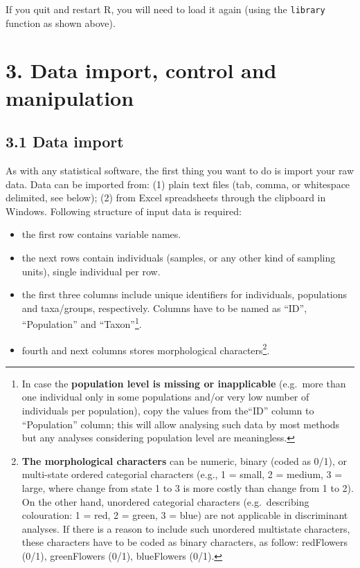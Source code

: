 \documentclass[
]{article}
\providecommand{\tightlist}{%
  \setlength{\itemsep}{0pt}\setlength{\parskip}{0pt}}
\begin{document}
If you quit and restart R, you will need to load it again (using the
\texttt{library} function as shown above).

\hypertarget{data-import-control-and-manipulation}{%
\section{3. Data import, control and
manipulation}\label{data-import-control-and-manipulation}}

\hypertarget{data-import}{%
\subsection{3.1 Data import}\label{data-import}}

As with any statistical software, the first thing you want to do is
import your raw data. Data can be imported from: (1) plain text files
(tab, comma, or whitespace delimited, see below); (2) from Excel
spreadsheets through the clipboard in Windows. Following structure of
input data is required:

\begin{itemize}
\tightlist
\item
  the first row contains variable names.
\item
  the next rows contain individuals (samples, or any other kind of
  sampling units), single individual per row.
\item
  the first three columns include unique identifiers for individuals,
  populations and taxa/groups, respectively. Columns have to be named as
  ``ID'', ``Population'' and ``Taxon''\footnote{In case the
    \textbf{population level is missing or inapplicable} (e.g.~more than
    one individual only in some populations and/or very low number of
    individuals per population), copy the values from the``ID'' column
    to ``Population'' column; this will allow analysing such data by
    most methods but any analyses considering population level are
    meaningless.}.
\item
  fourth and next columns stores morphological characters\footnote{\textbf{The
    morphological characters} can be numeric, binary (coded as 0/1), or
    multi-state ordered categorial characters (e.g., 1 = small, 2 =
    medium, 3 = large, where change from state 1 to 3 is more costly
    than change from 1 to 2). On the other hand, unordered categorial
    characters (e.g.~describing colouration: 1 = red, 2 = green, 3 =
    blue) are not applicable in discriminant analyses. If there is a
    reason to include such unordered multistate characters, these
    characters have to be coded as binary characters, as follow:
    redFlowers (0/1), greenFlowers (0/1), blueFlowers (0/1).}.
\end{itemize}
\end{document}
